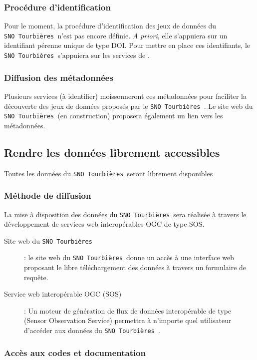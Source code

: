 \documentclass[]{article}
\newcommand{\mhref}[3][blue]{\href{#2}{\color{#1}{#3}}}%
\newcommand{\SNOT}{{\tt SNO~Tourbières }}
\begin{document}
\subsubsection{Procédure d'identification}
	
Pour le moment, la procédure d'identification des jeux de données du \SNOT n'est pas encore définie. \textit{A priori}, elle s'appuiera sur un identifiant pérenne unique de type DOI. Pour mettre en place ces identifiants, le \SNOT s'appuiera sur les services de \mhref{http://www.inist.fr/?Attribution-de-DOI&lang=fr}{l'INIST-CNRS}.
	
\subsubsection{Diffusion des métadonnées}
	
Plusieurs services (à identifier) moissonneront ces métadonnées pour faciliter la découverte des jeux de données proposés par le \SNOT. Le site web du \SNOT (en construction) proposera également un lien vers les métadonnées.
	
\subsection{Rendre les données librement accessibles}
	
Toutes les données du \SNOT seront librement disponibles
	
\subsubsection{Méthode de diffusion}
	
La mise à disposition des données du \SNOT sera réalisée à travers le développement de services web interopérables OGC de type SOS.
	
\begin{description}
	\item [Site web du \SNOT] : le site web du \SNOT donne un accès à une interface web proposant le libre téléchargement des données à travers un formulaire de requête.
	\item[Service web interopérable OGC (SOS)] : Un moteur de génération de flux de données interopérable de type (Sensor Observation Service) permettra à n'importe quel utilisateur d'accéder aux données du \SNOT.
\end{description}
	
\subsubsection{Accès aux codes et documentation}
\end{document}
